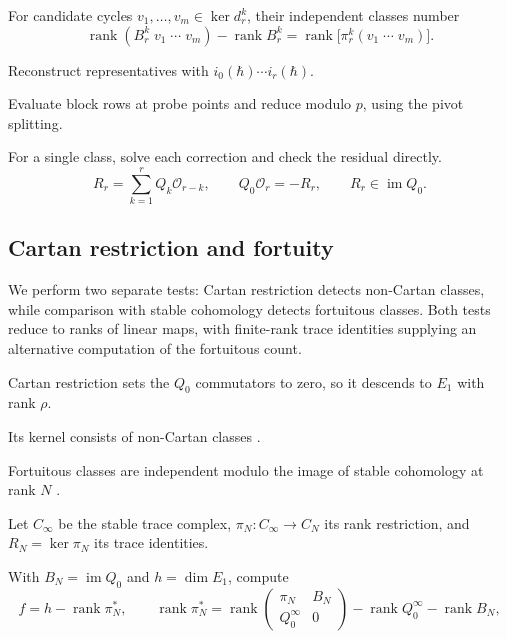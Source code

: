 \documentclass[11pt]{article}
\numberwithin{equation}{section}
\numberwithin{figure}{section}
\numberwithin{table}{section}
\begin{document}
For candidate cycles $v_1,\ldots,v_m\in\ker d_r^k$, their independent classes number
\begin{equation}\label{eq-page-independence}
\operatorname{rank}(B_r^k\;v_1\;\cdots\;v_m)
-\operatorname{rank}B_r^k
=\operatorname{rank}\bigl[\pi_r^k(v_1\;\cdots\;v_m)\bigr].
\end{equation}

Reconstruct representatives with $i_0(\hbar)\cdots i_r(\hbar)$.

Evaluate block rows at probe points and reduce modulo $p$, using the pivot splitting.

For a single class, solve each correction and check the residual directly.
\begin{equation*}
R_r=\sum_{k=1}^rQ_k\mathcal O_{r-k},\qquad Q_0\mathcal O_r=-R_r,\qquad R_r\in\operatorname{im}Q_0.
\end{equation*}

\subsection{Cartan restriction and fortuity}\label{sec-E-fort}

We perform two separate tests: Cartan restriction detects non-Cartan classes, while comparison with stable cohomology detects fortuitous classes. Both tests reduce to ranks of linear maps, with finite-rank trace identities supplying an alternative computation of the fortuitous count.

Cartan restriction sets the $Q_0$ commutators to zero, so it descends to $E_1$ with rank $\rho$.

Its kernel consists of non-Cartan classes \cite[Definition 1]{ChangChevalley}.

Fortuitous classes are independent modulo the image of stable cohomology at rank $N$ \cite{microstates,ChangChevalley}.

Let $C_\infty$ be the stable trace complex, $\pi_N:C_\infty\to C_N$ its rank restriction, and $R_N=\ker\pi_N$ its trace identities.

With $B_N=\operatorname{im}Q_0$ and $h=\dim E_1$, compute
\begin{equation}\label{eq-E-fort}
f=h-\operatorname{rank}\pi_N^*,\qquad \operatorname{rank}\pi_N^*=\operatorname{rank}\begin{pmatrix}\pi_N&B_N\\ Q_0^\infty&0\end{pmatrix}-\operatorname{rank}Q_0^\infty-\operatorname{rank}B_N,
\end{equation}
\end{document}
